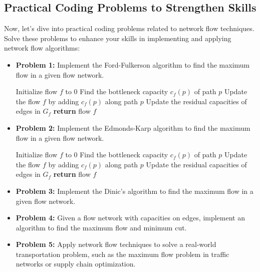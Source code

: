 \documentclass[12pt]{book} %
\begin{document}
\subsection{Practical Coding Problems to Strengthen Skills}

Now, let's dive into practical coding problems related to network flow techniques. Solve these problems to enhance your skills in implementing and applying network flow algorithms:

\begin{itemize}
    \item \textbf{Problem 1:} Implement the Ford-Fulkerson algorithm to find the maximum flow in a given flow network.
    
    \begin{algorithm}
    \caption{Ford-Fulkerson Algorithm}\label{ford-fulkerson}
    \begin{algorithmic}[1]
    \State Initialize flow $f$ to 0
    \State Find the bottleneck capacity $c_f(p)$ of path $p$
    \State Update the flow $f$ by adding $c_f(p)$ along path $p$
    \State Update the residual capacities of edges in $G_f$
    \EndWhile
    \State \textbf{return} flow $f$
    \EndProcedure
    \end{algorithmic}
    \end{algorithm}
    
    
    \item \textbf{Problem 2:} Implement the Edmonds-Karp algorithm to find the maximum flow in a given flow network.
    
    \begin{algorithm}
    \caption{Edmonds-Karp Algorithm}\label{edmonds-karp}
    \begin{algorithmic}[1]
    \State Initialize flow $f$ to 0
    \State Find the bottleneck capacity $c_f(p)$ of path $p$
    \State Update the flow $f$ by adding $c_f(p)$ along path $p$
    \State Update the residual capacities of edges in $G_f$
    \EndWhile
    \State \textbf{return} flow $f$
    \EndProcedure
    \end{algorithmic}
    \end{algorithm}
    
    \FloatBarrier
    
    
    \item \textbf{Problem 3:} Implement the Dinic's algorithm to find the maximum flow in a given flow network.
    
    \item \textbf{Problem 4:} Given a flow network with capacities on edges, implement an algorithm to find the maximum flow and minimum cut.
    
    \item \textbf{Problem 5:} Apply network flow techniques to solve a real-world transportation problem, such as the maximum flow problem in traffic networks or supply chain optimization.
\end{itemize}
\end{document}
